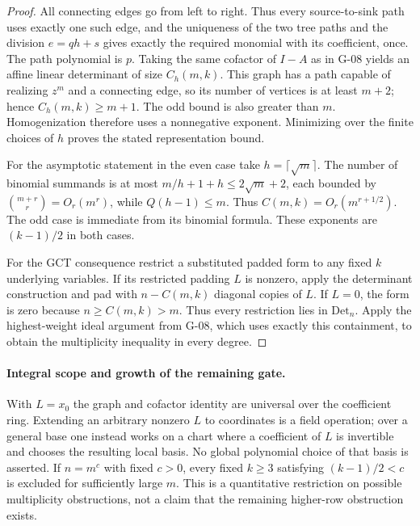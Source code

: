 \documentclass[11pt,a4paper]{article}
\theoremstyle{definition}\newtheorem{definition}{Definition}
\begin{document}
\begin{proof}
All connecting edges go from left to right. Thus every source-to-sink path uses exactly one such edge, and the uniqueness of the two tree paths and the division $e=qh+s$ gives exactly the required monomial with its coefficient, once. The path polynomial is $p$. Taking the same cofactor of $I-A$ as in G-08 yields an affine linear determinant of size $C_h(m,k)$. This graph has a path capable of realizing $z^m$ and a connecting edge, so its number of vertices is at least $m+2$; hence $C_h(m,k)\geq m+1$. The odd bound is also greater than $m$. Homogenization therefore uses a nonnegative exponent. Minimizing over the finite choices of $h$ proves the stated representation bound.

For the asymptotic statement in the even case take $h=\lceil\sqrt m\rceil$. The number of binomial summands is at most $m/h+1+h\leq2\sqrt m+2$, each bounded by $\binom{m+r}{r}=O_r(m^r)$, while $Q(h-1)\leq m$. Thus $C(m,k)=O_r(m^{r+1/2})$. The odd case is immediate from its binomial formula. These exponents are $(k-1)/2$ in both cases.

For the GCT consequence restrict a substituted padded form to any fixed $k$ underlying variables. If its restricted padding $L$ is nonzero, apply the determinant construction and pad with $n-C(m,k)$ diagonal copies of $L$. If $L=0$, the form is zero because $n\geq C(m,k)>m$. Thus every restriction lies in $\mathrm{Det}_n$. Apply the highest-weight ideal argument from G-08, which uses exactly this containment, to obtain the multiplicity inequality in every degree.
\end{proof}
\paragraph{Integral scope and growth of the remaining gate.}
With $L=x_0$ the graph and cofactor identity are universal over the coefficient ring. Extending an arbitrary nonzero $L$ to coordinates is a field operation; over a general base one instead works on a chart where a coefficient of $L$ is invertible and chooses the resulting local basis. No global polynomial choice of that basis is asserted. If $n=m^c$ with fixed $c>0$, every fixed $k\geq3$ satisfying $(k-1)/2<c$ is excluded for sufficiently large $m$. This is a quantitative restriction on possible multiplicity obstructions, not a claim that the remaining higher-row obstruction exists.


\end{document}
